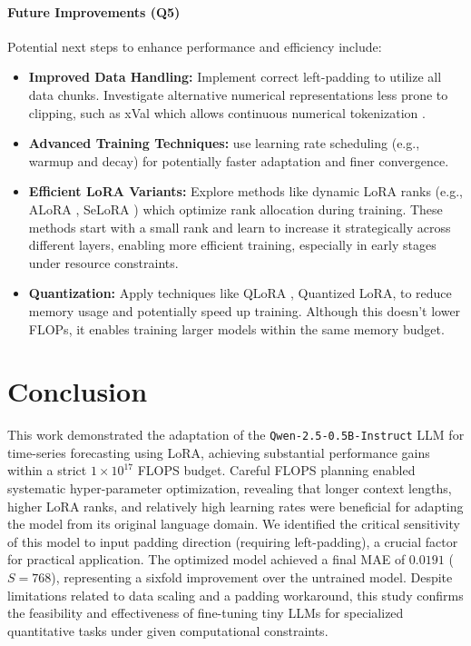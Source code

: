 \documentclass{article}
\begin{document}
\paragraph{Future Improvements (Q5)}
Potential next steps to enhance performance and efficiency include:
\begin{itemize}
    \item \textbf{Improved Data Handling:} Implement correct left-padding to utilize all data chunks. Investigate alternative numerical representations less prone to clipping, such as xVal which allows continuous numerical tokenization
 \cite{golkar2024xvalcontinuousnumericaltokenization}.
    \item \textbf{Advanced Training Techniques:} use learning rate scheduling (e.g., warmup and decay) for potentially faster adaptation and finer convergence.
    \item \textbf{Efficient LoRA Variants:} Explore methods like dynamic LoRA ranks (e.g., ALoRA \cite{liu2024aloraallocatinglowrankadaptation}, SeLoRA \cite{mao2024seloraselfexpandinglowrankadaptation}) which optimize rank allocation during training. These methods start with a small rank and learn to increase it strategically across different layers, enabling more efficient training, especially in early stages under resource constraints.
    \item \textbf{Quantization:} Apply techniques like QLoRA \cite{dettmers2023qloraefficientfinetuningquantized}, Quantized LoRA, to reduce memory usage and potentially speed up training. Although this doesn't lower FLOPs, it enables training larger models within the same memory budget.
\end{itemize}

\section{Conclusion}
\label{sec:conclusion}
This work demonstrated the adaptation of the \texttt{Qwen-2.5-0.5B-Instruct} LLM for time-series forecasting using LoRA, achieving substantial performance gains within a strict $1 \times 10^{17}$ FLOPS budget. Careful FLOPS planning enabled systematic hyper-parameter optimization, revealing that longer context lengths, higher LoRA ranks, and relatively high learning rates were beneficial for adapting the model from its original language domain. We identified the critical sensitivity of this model to input padding direction (requiring left-padding), a crucial factor for practical application. The optimized model achieved a final MAE of \(0.0191\) (\(S=768\)), representing a sixfold improvement over the untrained model. Despite limitations related to data scaling and a padding workaround, this study confirms the feasibility and effectiveness of fine-tuning tiny LLMs for specialized quantitative tasks under given computational constraints.
\end{document}
